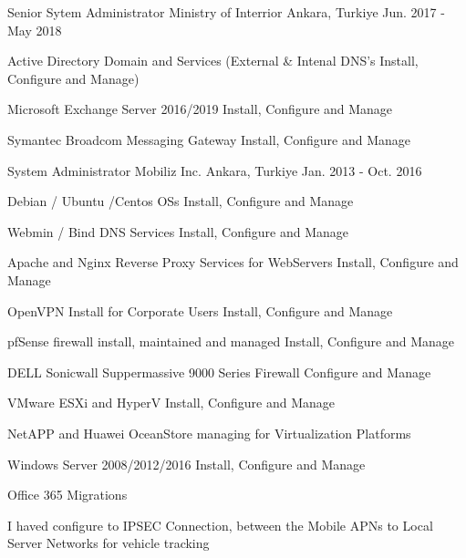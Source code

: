 \begin{cventries}
  \cventry
    {Senior Sytem Administrator} %
    {Ministry of Interrior} %
    {Ankara, Turkiye} %
    {Jun. 2017 - May 2018} %
    {
      \begin{cvitems} %
        \item {Active Directory Domain and Services (External \& Intenal DNS's Install, Configure and Manage)}
        \item {Microsoft Exchange Server 2016/2019 Install, Configure and Manage}
        \item {Symantec Broadcom Messaging Gateway Install, Configure and Manage}
      \end{cvitems}
    }

  \cventry
    {System Administrator} %
    {Mobiliz Inc.} %
    {Ankara, Turkiye} %
    {Jan. 2013 - Oct. 2016} %
    {
      \begin{cvitems} %
        \item {Debian / Ubuntu /Centos OSs Install, Configure and Manage}
        \item {Webmin / Bind DNS Services Install, Configure and Manage}
        \item {Apache and Nginx Reverse Proxy Services for WebServers Install, Configure and Manage}
        \item {OpenVPN Install for Corporate Users Install, Configure and Manage}
        \item {pfSense firewall install, maintained and managed Install, Configure and Manage}
        \item {DELL Sonicwall Suppermassive 9000 Series Firewall Configure and Manage}
        \item {VMware ESXi and HyperV Install, Configure and Manage}
        \item {NetAPP and Huawei OceanStore managing for Virtualization Platforms}
        \item {Windows Server 2008/2012/2016 Install, Configure and Manage}
        \item {Office 365 Migrations}
        \item {I haved configure to IPSEC Connection, between the Mobile APNs to Local Server Networks for vehicle tracking}
      \end{cvitems} 
    }


\end{cventries}
